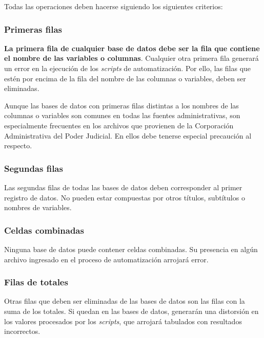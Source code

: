 \documentclass[
  spanish,
]{book}
\begin{document}
Todas las operaciones deben hacerse siguiendo los siguientes criterios:

\hypertarget{primeras-filas}{%
\subsubsection{Primeras filas}\label{primeras-filas}}

\textbf{La primera fila de cualquier base de datos debe ser la fila que contiene el nombre de las variables o columnas}. Cualquier otra primera fila generará un error en la ejecución de los \emph{scripts} de automatización. Por ello, las filas que estén por encima de la fila del nombre de las columnas o variables, deben ser eliminadas.

Aunque las bases de datos con primeras filas distintas a los nombres de las columnas o variables son comunes en todas las fuentes administrativas, son especialmente frecuentes en los archivos que provienen de la Corporación Administrativa del Poder Judicial. En ellos debe tenerse especial precaución al respecto.

\hypertarget{segundas-filas}{%
\subsubsection{Segundas filas}\label{segundas-filas}}

Las segundas filas de todas las bases de datos deben corresponder al primer registro de datos. No pueden estar compuestas por otros títulos, subtítulos o nombres de variables.

\hypertarget{celdas-combinadas}{%
\subsubsection{Celdas combinadas}\label{celdas-combinadas}}

Ninguna base de datos puede contener celdas combinadas. Su presencia en algún archivo ingresado en el proceso de automatización arrojará error.

\hypertarget{filas-de-totales}{%
\subsubsection{Filas de totales}\label{filas-de-totales}}

Otras filas que deben ser eliminadas de las bases de datos son las filas con la suma de los totales. Si quedan en las bases de datos, generarán una distorsión en los valores procesados por los \emph{scripts}, que arrojará tabulados con resultados incorrectos.
\end{document}
